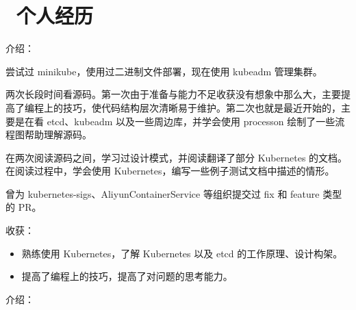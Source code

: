 \documentclass{resume}
\begin{document}
\section{\faUsers\ 个人经历} \vspace{1mm}


\vspace{1mm}\par
\noindent
介绍：
\vspace{1mm}\par
\setlength{\parindent}{2ex}
尝试过 minikube，使用过二进制文件部署，现在使用 kubeadm 管理集群。\vspace{1mm}\par
两次长段时间看源码。第一次由于准备与能力不足收获没有想象中那么大，主要提高了编程上的技巧，使代码结构层次清晰易于维护。第二次也就是最近开始的，主要是在看 etcd、kubeadm 以及一些周边库，并学会使用 processon 绘制了一些流程图帮助理解源码。\vspace{1mm}\par
在两次阅读源码之间，学习过设计模式，并阅读翻译了部分 Kubernetes 的文档。在阅读过程中，学会使用 Kubernetes，编写一些例子测试文档中描述的情形。\vspace{1mm}\par
曾为 kubernetes-sigs、AliyunContainerService 等组织提交过 fix 和 feature 类型的 PR。\vspace{1mm}\par

\vspace{2mm}\par
\noindent
收获：
\begin{itemize}[parsep=1mm]
	\item 熟练使用 Kubernetes，了解 Kubernetes 以及 etcd 的工作原理、设计构架。
	\item 提高了编程上的技巧，提高了对问题的思考能力。
\end{itemize}

\faLink {}

\vspace{1mm}\par
\noindent
介绍：
\end{document}

